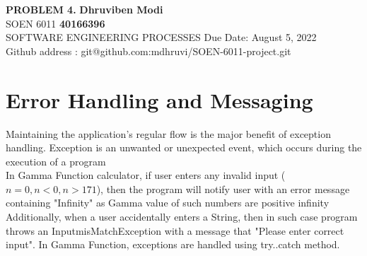 \documentclass[a4paper, 11pt]{article}
\begin{document}
\noindent
\large\textbf{PROBLEM 4.} \hfill \textbf{Dhruviben Modi} \\
\normalsize SOEN 6011 \hfill \textbf{40166396} \\
 SOFTWARE ENGINEERING PROCESSES \hfill Due Date: August 5, 2022 \\
\hfill Github address : git@github.com:mdhruvi/SOEN-6011-project.git


\section{Error Handling and Messaging}
\indent\indent Maintaining the application's regular flow is the major benefit of exception handling. Exception is an unwanted or unexpected event, which occurs during the execution of a program\\

In Gamma Function calculator, if user enters any invalid input ($n = 0, n < 0, n > 171$), then the program will notify user with an error message containing "Infinity" as Gamma value of such numbers are positive infinity\\

Additionally, when a user accidentally enters a String, then in such case program throws an InputmisMatchException with a message that "Please enter correct input". In Gamma Function, exceptions are handled using try..catch method.\\
\end{document}
